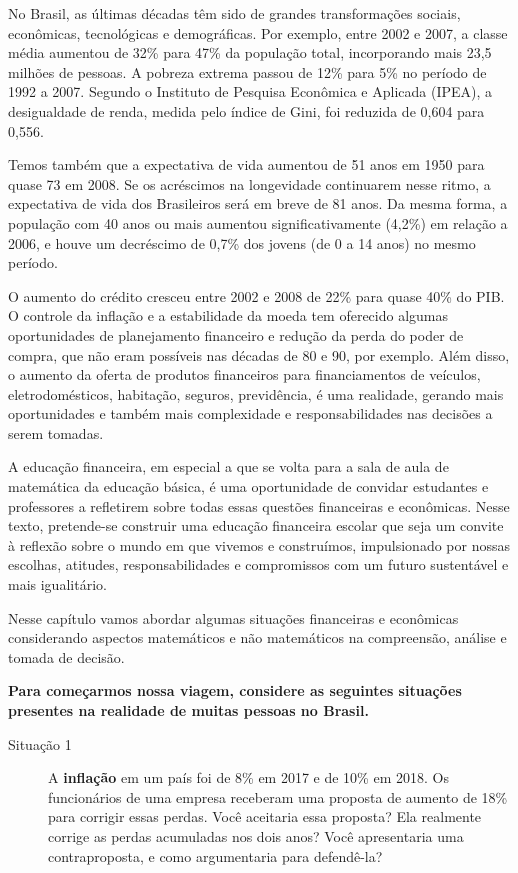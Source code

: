 \setcounter{page}{1}
\label{fin-exp-1}
No Brasil, as últimas décadas têm sido de grandes transformações sociais, econômicas, tecnológicas e demográficas. Por exemplo, entre 2002 e 2007, a classe média aumentou de 32\% para 47\% da população total, incorporando mais 23,5 milhões de pessoas. A pobreza extrema passou de 12\% para 5\% no período de 1992 a 2007. Segundo o Instituto de Pesquisa Econômica e Aplicada (IPEA), a desigualdade de renda, medida pelo índice de Gini, foi reduzida de 0,604 para 0,556.

Temos também que a expectativa de vida aumentou de 51 anos em 1950 para quase 73 em 2008. Se os acréscimos na longevidade continuarem nesse ritmo, a expectativa de vida dos Brasileiros será em breve de 81 anos. Da mesma forma, a população com 40 anos ou mais aumentou significativamente (4,2\%) em relação a 2006, e houve um decréscimo de 0,7\% dos jovens (de 0 a 14 anos) no mesmo período. 

O aumento do crédito cresceu entre 2002 e 2008 de 22\% para quase 40\% do PIB. O controle da inflação e a estabilidade da moeda tem oferecido algumas oportunidades de planejamento financeiro e redução da perda do poder de compra, que não eram possíveis nas décadas de 80 e 90, por exemplo. Além disso, o aumento da oferta de produtos financeiros para financiamentos de veículos, eletrodomésticos, habitação, seguros, previdência, é uma realidade, gerando mais oportunidades e também mais complexidade e responsabilidades nas decisões a serem tomadas.

A educação financeira, em especial a que se volta para a sala de aula de matemática da educação básica, é uma oportunidade de convidar estudantes e professores a refletirem sobre todas essas questões financeiras e econômicas. Nesse texto, pretende-se construir uma educação financeira escolar que seja um convite à reflexão sobre o mundo em que vivemos e construímos, impulsionado por nossas escolhas, atitudes, responsabilidades e compromissos com um futuro sustentável e mais igualitário.

Nesse capítulo vamos abordar algumas situações financeiras e econômicas considerando aspectos matemáticos e não matemáticos na compreensão, análise e tomada de decisão.

\textbf{Para começarmos nossa viagem, considere as seguintes situações presentes na realidade de muitas pessoas no Brasil.}

\begin{description}
\item[{Situação 1}] \leavevmode{}\label{fin-def-1}
A \textbf{inflação} em um país foi de 8\% em 2017 e de 10\% em 2018. Os funcionários de uma empresa receberam uma proposta de aumento de 18\% para corrigir essas perdas. Você aceitaria essa proposta? Ela realmente corrige as perdas acumuladas nos dois anos? Você apresentaria uma contraproposta, e como argumentaria para defendê-la?
\end{description}

